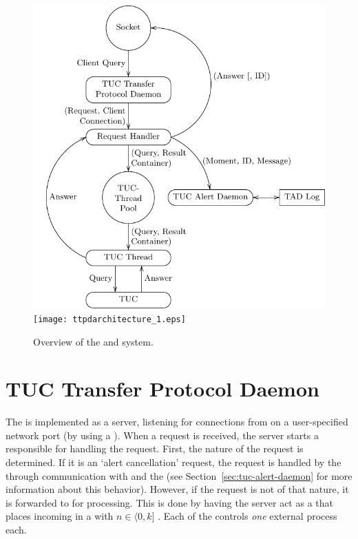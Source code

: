 \documentclass[a4paper,english,11pt,twoside,openright]{book}
\begin{document}
\begin{figure}[htbp]
  \centering
  \ifpdf%
    \includegraphics[width=1.05\textwidth]{ttpdarchitecture_1.pdf}%
  \else%
    \texttt{[image: ttpdarchitecture\_1.eps]}%
  \fi
  \caption{Overview of the \protect{} and \protect{}
    system.}

  \label{fig:overview}
\end{figure}


\section{TUC Transfer Protocol Daemon}
\label{sec:tuc-transf-prot}

The  is implemented as a  server, listening
for connections from  on a user-specified network port (by
using a ).  When a request is received, the server starts a
 responsible for handling the request.  First, the
nature of the request is determined.  If it is an `alert cancellation'
request, the request is handled by the  through
communication with  and the  (see
Section~\ref{sec:tuc-alert-daemon} for more information about this
behavior).  However, if the request is not of that nature, it is
forwarded to  for processing.  This is done by having the
server act as a  that places incoming 
in a  with $n \in \langle0, k]$ .  Each
of the  controls \emph{one} external 
process each.
\end{document}
